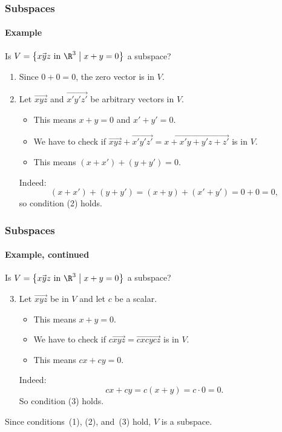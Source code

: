 \begin{frame}
\frametitle{Subspaces}
\framesubtitle{Example}

\vskip-3mm
\begin{eg}
  Is $V = \left\{ \vec{x y z} \text{ in }\R^3\bigm\vert x+y=0 \right\}$ a
  subspace?
  \begin{webonly}
  \begin{enumerate}
  \item Since $0 + 0 = 0$, the zero vector is in $V$.
  \item Let $\vec{x y z}$ and $\vec{x' y' z'}$ be arbitrary vectors in $V$.  
    \begin{itemize}
    \item This means $x+y=0$ and $x'+y'=0$.
    \item We have to check if
      $\vec{x y z} + \vec{x' y' z'} = \vec{x+x' y+y' z+z'}$ is in $V$.
    \item This means $(x+x') + (y+y') = 0$.  
    \end{itemize}
    Indeed:
    \[ (x+x') + (y+y') = (x+y) + (x'+y') = 0+0 = 0, \]
    so condition (2) holds.
  \end{enumerate}
  \end{webonly}
\end{eg}

\end{frame}



\begin{frame}
\frametitle{Subspaces}
\framesubtitle{Example, continued}

\vskip-3mm
\begin{eg}
  Is $V = \left\{ \vec{x y z} \text{ in }\R^3\bigm\vert x+y=0 \right\}$ a subspace?
  \vskip1mm
  \begin{webonly}
  \begin{enumerate}\setcounter{enumi}{2}
  \item Let $\vec{x y z}$ be in $V$ and let $c$ be a scalar.
    \begin{itemize}
    \item This means $x+y = 0$.
    \item We have to check if $c\vec{x y z} = \vec{cx cy cz}$ is in $V$.
    \item This means $cx + cy = 0$.
    \end{itemize}
    Indeed:
    \[ cx + cy = c(x+y) = c\cdot 0 = 0. \]
    So condition (3) holds.
  \end{enumerate}
  \end{webonly}
  \pause\medskip
  Since conditions~(1), (2), and~(3) hold, $V$ is a subspace.
\end{eg}

\end{frame}


